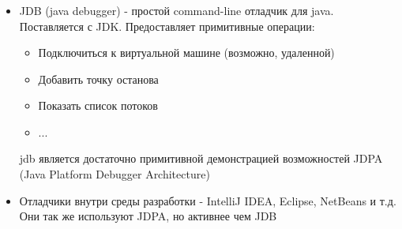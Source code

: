 \begin{frame}
\frametitle{\insertsection} 
\framesubtitle{\insertsubsection}
\begin{itemize}
	\item JDB (java debugger) - простой command-line отладчик для java. Поставляется с JDK. Предоставляет примитивные операции:
	\begin{itemize}
		\item Подключиться к виртуальной машине (возможно, удаленной)
		\item Добавить точку останова
		\item Показать список потоков
		\item ...
	\end{itemize}
	jdb является достаточно примитивной демонстрацией возможностей JDPA (Java Platform Debugger Architecture)
	\item Отладчики внутри среды разработки - IntelliJ IDEA, Eclipse, NetBeans и т.д. Они так же 
	используют JDPA, но активнее чем JDB
\end{itemize}
\end{frame}
